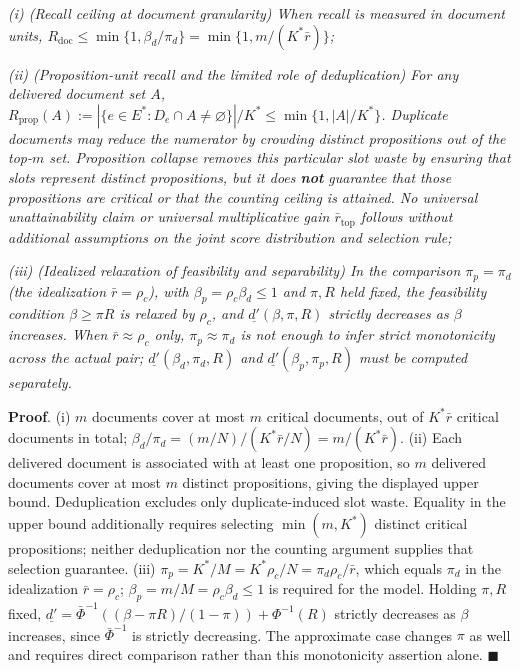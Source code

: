 \documentclass[
  11pt]{article}
\begin{document}
\emph{(i) (Recall ceiling at document granularity) When recall is
measured in document units,
\(R_{\mathrm{doc}} \le \min\{1, \beta_d/\pi_d\} = \min\{1, m/(K^*\bar r)\}\);}

\emph{(ii) (Proposition-unit recall and the limited role of
deduplication) For any delivered document set \(A\),
\(R_{\mathrm{prop}}(A):=|\{e\in E^*:D_e\cap A\ne\varnothing\}|/K^*\le\min\{1,|A|/K^*\}\).
Duplicate documents may reduce the numerator by crowding distinct
propositions out of the top-\(m\) set. Proposition collapse removes this
particular slot waste by ensuring that slots represent distinct
propositions, but it does \textbf{not} guarantee that those propositions
are critical or that the counting ceiling is attained. No universal
unattainability claim or universal multiplicative gain
\(\bar r_{\mathrm{top}}\) follows without additional assumptions on the
joint score distribution and selection rule;}

\emph{(iii) (Idealized relaxation of feasibility and separability) In
the comparison \(\pi_p=\pi_d\) (the idealization \(\bar r=\rho_c\)),
with \(\beta_p=\rho_c\beta_d\le1\) and \(\pi,R\) held fixed, the
feasibility condition \(\beta\ge\pi R\) is relaxed by \(\rho_c\), and
\(\underline{d'}(\beta,\pi,R)\) strictly decreases as \(\beta\)
increases. When \(\bar r\approx\rho_c\) only, \(\pi_p\approx\pi_d\) is
not enough to infer strict monotonicity across the actual pair;
\(\underline{d'}(\beta_d,\pi_d,R)\) and
\(\underline{d'}(\beta_p,\pi_p,R)\) must be computed separately.}

\textbf{Proof}. (i) \(m\) documents cover at most \(m\) critical
documents, out of \(K^*\bar r\) critical documents in total;
\(\beta_d/\pi_d = (m/N)/(K^*\bar r/N) = m/(K^*\bar r)\). (ii) Each
delivered document is associated with at least one proposition, so \(m\)
delivered documents cover at most \(m\) distinct propositions, giving
the displayed upper bound. Deduplication excludes only duplicate-induced
slot waste. Equality in the upper bound additionally requires selecting
\(\min(m,K^*)\) distinct critical propositions; neither deduplication
nor the counting argument supplies that selection guarantee. (iii)
\(\pi_p=K^*/M=K^*\rho_c/N=\pi_d\rho_c/\bar r\), which equals \(\pi_d\)
in the idealization \(\bar r=\rho_c\); \(\beta_p=m/M=\rho_c\beta_d\le1\)
is required for the model. Holding \(\pi,R\) fixed,
\(\underline{d'}=\bar\Phi^{-1}((\beta-\pi R)/(1-\pi))+\Phi^{-1}(R)\)
strictly decreases as \(\beta\) increases, since \(\bar\Phi^{-1}\) is
strictly decreasing. The approximate case changes \(\pi\) as well and
requires direct comparison rather than this monotonicity assertion
alone. \(\blacksquare\)
\end{document}
